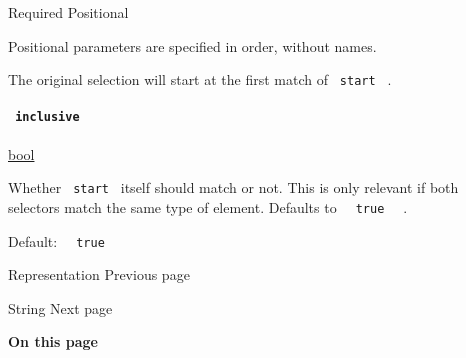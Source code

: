 {Required} {{ Positional }}

\label{definitions-after-start-positional-tooltip}
Positional parameters are specified in order, without names.

The original selection will start at the first match of
\texttt{\ start\ } .

\paragraph{\texorpdfstring{\texttt{\ inclusive\ }}{ inclusive }}\label{definitions-after-inclusive}

\href{/docs/reference/foundations/bool/}{bool}

Whether \texttt{\ start\ } itself should match or not. This is only
relevant if both selectors match the same type of element. Defaults to
\texttt{\ }{\texttt{\ true\ }}\texttt{\ } .

Default: \texttt{\ }{\texttt{\ true\ }}\texttt{\ }

\href{/docs/reference/foundations/repr/}{\pandocbounded{}}

{ Representation } { Previous page }

\href{/docs/reference/foundations/str/}{\pandocbounded{}}

{ String } { Next page }

\textbf{On this page}

